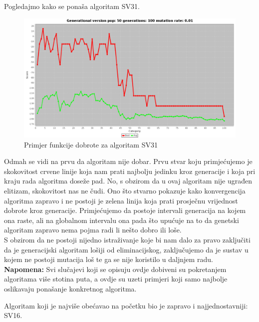 \documentclass[times, utf8, zavrsni]{fer}
\begin{document}

Pogledajmo kako se ponaša algoritam SV31. 

\begin{figure}[!htb]
	\centering
	\includegraphics[width=18cm]{slike/SV31Hibrid.png}
	\caption{Primjer funkcije dobrote za algoritam SV31}
	\label{fig:sv31-alg-hibrid}
\end{figure} 


Odmah se vidi na prvu da algoritam nije dobar. Prvu stvar koju primjećujemo je skokovitost crvene linije koja nam prati najbolju jedinku kroz generacije i koja pri kraju rada algoritma doseže pad. No, s obzirom da u ovaj algoritam nije ugrađen elitizam, skokovitost nas ne čudi. Ono što stvarno pokazuje kako konvergencija algoritma zapravo i ne postoji je zelena linija koja prati prosječnu vrijednost dobrote kroz generacije. Primjećujemo da postoje intervali generacija na kojem ona raste, ali na globalnom intervalu ona pada što upućuje na to da genetski algoritam zapravo nema pojma radi li nešto dobro ili loše.\\
S obzirom da ne postoji nijedno istraživanje koje bi nam dalo za pravo zaključiti da je generacijski algoritam lošiji od eliminacijskog, zaključujemo da je sustav u kojem ne postoji mutacija loš te ga se nije koristilo u daljnjem radu. \\
\textbf{Napomena: } Svi slučajevi koji se opisuju ovdje dobiveni su pokretanjem algoritama više stotina puta, a ovdje su uzeti primjeri koji samo najbolje oslikavaju ponašanje konkretnog algoritma.  

Algoritam koji je najviše obećavao na početku bio je zapravo i najjednostavniji: SV16. 
\end{document}
